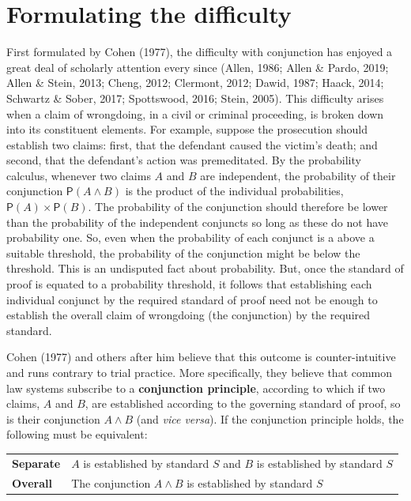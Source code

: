\documentclass[
  10pt,
  dvipsnames,enabledeprecatedfontcommands]{scrartcl}
\newcommand{\et}{\wedge}
\newcommand{\pr}[1]{\ensuremath{\mathsf{P}(#1)}}
\begin{document}
\hypertarget{formulating-the-difficulty}{%
\section{Formulating the difficulty}\label{formulating-the-difficulty}}

\label{sec:difficulty}

First formulated by Cohen (1977), the difficulty with conjunction has
enjoyed a great deal of scholarly attention every since (Allen, 1986;
Allen \& Pardo, 2019; Allen \& Stein, 2013; Cheng, 2012; Clermont, 2012;
Dawid, 1987; Haack, 2014; Schwartz \& Sober, 2017; Spottswood, 2016;
Stein, 2005). This difficulty arises when a claim of wrongdoing, in a
civil or criminal proceeding, is broken down into its constituent
elements. For example, suppose the prosecution should establish two
claims: first, that the defendant caused the victim's death; and second,
that the defendant's action was premeditated. By the probability
calculus, whenever two claims \(A\) and \(B\) are independent, the
probability of their conjunction \(\pr{A\wedge B}\) is the product of
the individual probabilities, \(\pr{A}\times \pr{B}\). The probability
of the conjunction should therefore be lower than the probability of the
independent conjuncts so long as these do not have probability one. So,
even when the probability of each conjunct is a above a suitable
threshold, the probability of the conjunction might be below the
threshold. This is an undisputed fact about probability. But, once the
standard of proof is equated to a probability threshold, it follows that
establishing each individual conjunct by the required standard of proof
need not be enough to establish the overall claim of wrongdoing (the
conjunction) by the required standard.

Cohen (1977) and others after him believe that this outcome is
counter-intuitive and runs contrary to trial practice. More
specifically, they believe that common law systems subscribe to a
\textbf{conjunction principle}, according to which if two claims, \(A\)
and \(B\), are established according to the governing standard of proof,
so is their conjunction \(A\wedge B\) (and \emph{vice versa}). If the
conjunction principle holds, the following must be equivalent:

\begin{center}
\begin{tabular}
{@{}ll@{}}
\toprule
\textbf{Separate} &   $A$ is established by standard $S$ and $B$ is established by standard $S$\\   
\textbf{Overall}  &   The conjunction $A \et B$ is established by standard $S$  \\ 
\bottomrule
\end{tabular}
\end{center}
\end{document}
